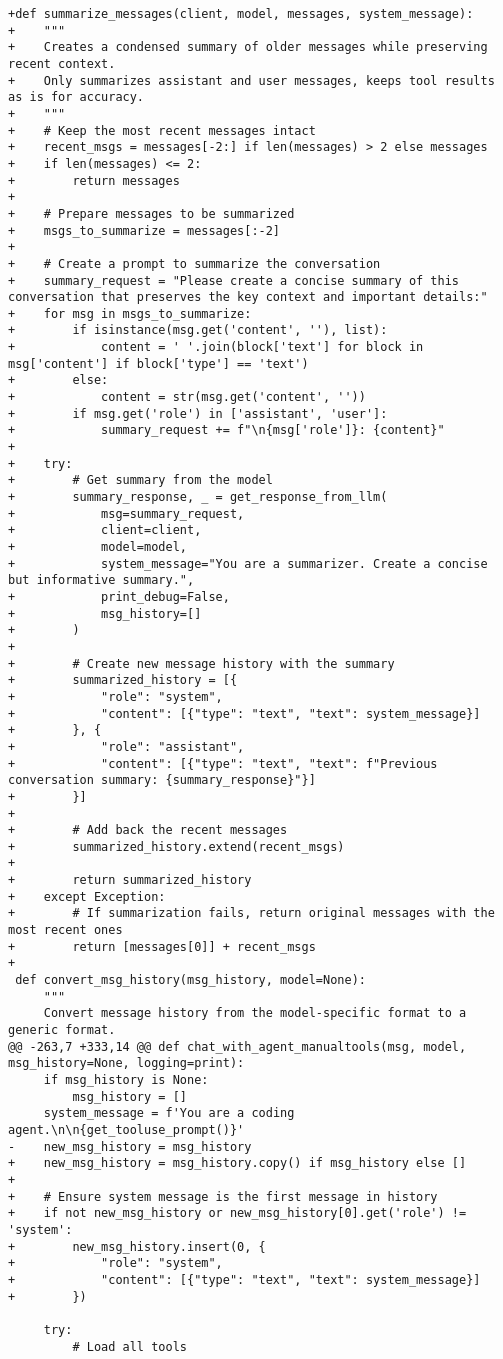 \begin{lstlisting}[style=diffstyle]
+def summarize_messages(client, model, messages, system_message):
+    """
+    Creates a condensed summary of older messages while preserving recent context.
+    Only summarizes assistant and user messages, keeps tool results as is for accuracy.
+    """
+    # Keep the most recent messages intact
+    recent_msgs = messages[-2:] if len(messages) > 2 else messages
+    if len(messages) <= 2:
+        return messages
+
+    # Prepare messages to be summarized
+    msgs_to_summarize = messages[:-2]
+    
+    # Create a prompt to summarize the conversation
+    summary_request = "Please create a concise summary of this conversation that preserves the key context and important details:"
+    for msg in msgs_to_summarize:
+        if isinstance(msg.get('content', ''), list):
+            content = ' '.join(block['text'] for block in msg['content'] if block['type'] == 'text')
+        else:
+            content = str(msg.get('content', ''))
+        if msg.get('role') in ['assistant', 'user']:
+            summary_request += f"\n{msg['role']}: {content}"
+
+    try:
+        # Get summary from the model
+        summary_response, _ = get_response_from_llm(
+            msg=summary_request,
+            client=client,
+            model=model,
+            system_message="You are a summarizer. Create a concise but informative summary.",
+            print_debug=False,
+            msg_history=[]
+        )
+        
+        # Create new message history with the summary
+        summarized_history = [{
+            "role": "system",
+            "content": [{"type": "text", "text": system_message}]
+        }, {
+            "role": "assistant",
+            "content": [{"type": "text", "text": f"Previous conversation summary: {summary_response}"}]
+        }]
+        
+        # Add back the recent messages
+        summarized_history.extend(recent_msgs)
+        
+        return summarized_history
+    except Exception:
+        # If summarization fails, return original messages with the most recent ones
+        return [messages[0]] + recent_msgs
+
 def convert_msg_history(msg_history, model=None):
     """
     Convert message history from the model-specific format to a generic format.
@@ -263,7 +333,14 @@ def chat_with_agent_manualtools(msg, model, msg_history=None, logging=print):
     if msg_history is None:
         msg_history = []
     system_message = f'You are a coding agent.\n\n{get_tooluse_prompt()}'
-    new_msg_history = msg_history
+    new_msg_history = msg_history.copy() if msg_history else []
+    
+    # Ensure system message is the first message in history
+    if not new_msg_history or new_msg_history[0].get('role') != 'system':
+        new_msg_history.insert(0, {
+            "role": "system",
+            "content": [{"type": "text", "text": system_message}]
+        })
 
     try:
         # Load all tools
\end{lstlisting}